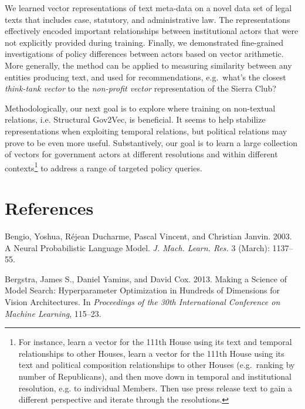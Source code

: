 \documentclass[11pt,letterpaper]{article}
\begin{document}
We learned vector representations of text meta-data on a novel data set of legal texts that includes case, statutory, and administrative law. The representations effectively encoded important relationships between institutional actors that were not explicitly provided during training. Finally, we demonstrated fine-grained investigations of policy differences between actors based on vector arithmetic. More generally, the method can be applied to measuring similarity between any entities producing text, and used for recommendations, e.g.~what's the closest \emph{think-tank vector} to the \emph{non-profit vector} representation of the Sierra Club?

Methodologically, our next goal is to explore where training on non-textual relations, i.e. Structural Gov2Vec, is beneficial. It seems to help stabilize representations when exploiting temporal relations, but political relations may prove to be even more useful. Substantively, our goal is to learn a large collection of vectors for government actors at different resolutions and within different contexts\footnote{For instance, learn a vector for the 111th House using its text and temporal relationships to other Houses, learn a vector for the 111th House using its text and political composition relationships to other Houses (e.g.~ranking by number of Republicans), and then move down in temporal and institutional resolution, e.g. to individual Members. Then use press release text to gain a different perspective and iterate through the resolutions.}  to address a range of targeted policy queries.

\section*{References}\label{references}

\hypertarget{refs}{}
\hypertarget{ref-bengioux5fneuralux5f2003}{}
Bengio, Yoshua, Réjean Ducharme, Pascal Vincent, and Christian Janvin.
2003. A Neural Probabilistic Language Model. \emph{J. Mach. Learn.
Res.} 3 (March): 1137--55.

\hypertarget{ref-bergstraux5fmakingux5f2013}{}
Bergstra, James S., Daniel Yamins, and David Cox. 2013. Making a
Science of Model Search: Hyperparameter Optimization in Hundreds of
Dimensions for Vision Architectures. In \emph{Proceedings of the 30th
International Conference on Machine Learning}, 115--23.

\end{document}
